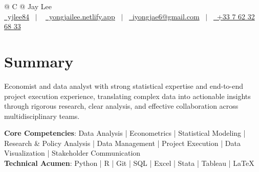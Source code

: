 \documentclass[a4paper,12pt]{article}
\begin{document}
\pagestyle{empty} 



\begin{tabularx}{\linewidth}{@{} C @{}}
\Huge{Jay Lee} \\[7.5pt]
\href{https://github.com/yjlee84}{\raisebox{-0.05\height}\faGithub\ yjlee84} \ $|$ \ 
\href{https://yongjailee.netlify.app}{\raisebox{-0.05\height}\faGlobe \ yongjailee.netlify.app} \ $|$ \ 
\href{mailto:email@mysite.com}{\raisebox{-0.05\height}\faEnvelope \ iyongjae6@gmail.com} \ $|$ \ 
\href{tel:+000000000000}{\raisebox{-0.05\height}\faMobile \ +33 7 62 32 68 33} \\
\end{tabularx}


\section{Summary}
Economist and data analyst with strong statistical expertise and end-to-end project execution experience, translating complex data into actionable insights through rigorous research, clear analysis, and effective collaboration across multidisciplinary teams.

\textbf{Core Competencies}: Data Analysis | Econometrics | Statistical Modeling | Research \& Policy Analysis | Data Management | Project Execution | Data Visualization | Stakeholder Communication\\
\textbf{Technical Acumen}: Python | R | Git | SQL | Excel | Stata | Tableau | \LaTeX{}
\end{document}
